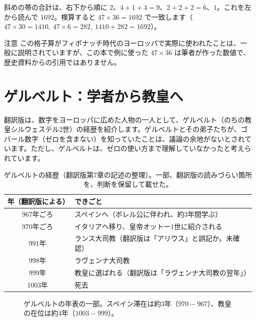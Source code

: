 \documentclass[a4paper,11pt,openany]{ltjsbook}
\begin{document}
斜めの帯の合計は、右下から順に $2$、$4+1+4=9$、$2+2+2=6$、$1$。これを左から読んで $1692$。検算すると $47\times36=1692$ で一致します（$47\times30=1410,\ 47\times6=282,\ 1410+282=1692$）。

\begin{notebox}{注意}
この格子算がフィボナッチ時代のヨーロッパで実際に使われたことは、一般に説明されていますが、この本で例に使った $47\times36$ は筆者が作った数値で、歴史資料からの引用ではありません。
\end{notebox}

\section{ゲルベルト：学者から教皇へ}

翻訳版は、数字をヨーロッパに広めた人物の一人として、ゲルベルト（のちの教皇シルウェステル2世）の経歴を紹介します。ゲルベルトとその弟子たちが、ゴバール数字（ゼロを含まない）を知っていたことは、議論の余地がないとされています。ただし、ゲルベルトは、ゼロの使い方まで理解していなかったと考えられています。

\begin{table}[htbp]
\centering
\begin{tabular}{cl}
\toprule
年（翻訳版による） & できごと\\
\midrule
967年ごろ & スペインへ（ボレル公に伴われ、約3年間学ぶ）\\
970年ごろ & イタリアへ移り、皇帝オットー1世に紹介される\\
991年 & ランス大司教（翻訳版は「アリウス」と誤記か。未確認）\\
998年 & ラヴェンナ大司教\\
999年 & 教皇に選ばれる（翻訳版は「ラヴェンナ大司教の翌年」）\\
1003年 & 死去\\
\bottomrule
\end{tabular}
\caption{ゲルベルトの経歴（翻訳版第7章の記述の整理）。一部、翻訳版の読みづらい箇所を、判断を保留して載せた。}
\end{table}

\begin{figure}[htbp]
\centering
{}
\caption{ゲルベルトの年表の一部。スペイン滞在は約3年（$970-967$）、教皇の在位は約4年（$1003-999$）。}
\end{figure}
\end{document}
